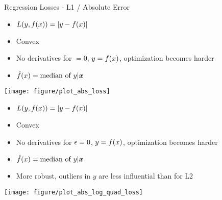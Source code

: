 \documentclass[11pt,compress,t,notes=noshow, xcolor=table]{beamer}
\newenvironment{knitrout}{}{} %
\begin{document}
\begin{vbframe}{Regression Losses - L1 / Absolute Error}
\begin{itemize}
\item $L(y, f(x)) = |y-f(x)|$
\item Convex
\item No derivatives for $ = 0$, $y = f(x)$, optimization becomes harder
\item $\hat{f}(x) = \text{median of } y | \bm{x}$
\end{itemize}

\begin{knitrout}\scriptsize
{}\color{fgcolor}

{\centering \texttt{[image: figure/plot\_abs\_loss]} 

}



\end{knitrout}

\framebreak

\begin{itemize}
\item $L(y, f(x)) = |y-f(x)|$
\item Convex
\item No derivatives for $\epsilon = 0$, $y = f(x)$, optimization becomes harder
\item $\hat{f}(x) = \text{median of } y | \bm{x}$
\item More robust, outliers in $y$ are less influential than for L2
\end{itemize}

\begin{knitrout}\scriptsize
{}\color{fgcolor}

{\centering \texttt{[image: figure/plot\_abs\_log\_quad\_loss]} 

}



\end{knitrout}

\end{vbframe}
\end{document}

